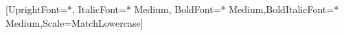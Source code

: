 \ifPDFTeX
\else
\fi

\usepackage{Alegreya}
\usepackage{AlegreyaSans}


\ifPDFTeX
\else
    \ifXeTeX
    \else %
    \fi
    \setmonofont{Fira Code}[UprightFont={*}, ItalicFont={* Medium}, BoldFont={* Medium},BoldItalicFont={* Medium},Scale=MatchLowercase]
\fi
